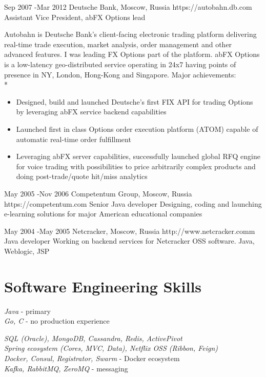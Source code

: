 \documentclass[10pt]{article} %
\begin{document}
\job
{Sep 2007 -}{Mar 2012}
{Deutsche Bank, Moscow, Russia}
{https://autobahn.db.com}
{Assistant Vice President, abFX Options lead}
{Autobahn is Deutsche Bank's client-facing electronic trading platform delivering real-time trade execution, market analysis, order management and other advanced features. 
I was leading FX Options part of the platform. abFX Options is a low-latency geo-distributed service operating in 24x7 having points of presence in NY, London, Hong-Kong and Singapore. 
Major achievements: \\*
\begin{itemize}
\item{Designed, build and launched Deutsche's first FIX API for trading Options by leveraging abFX service backend capabilities}
\item{Launched first in class Options order execution platform (ATOM) capable of automatic real-time order fulfillment}
\item{Leveraging abFX server capabilities, successfully launched global RFQ engine for voice trading with possibilities to price arbitrarily complex products and doing post-trade/quote hit/miss analytics}
\end{itemize}
}

\job
{May 2005 -}{Nov 2006}
{Competentum Group, Moscow, Russia}
{https://competentum.com}
{Senior Java developer}
{Designing, coding and launching e-learning solutions for major American educational companies}

\job
{May 2004 -}{May 2005}
{Netcracker, Moscow, Russia}
{http://www.netcracker.comm}
{Java developer}
{Working on backend services for Netcracker OSS software. Java, Weblogic, JSP}


\section{Software Engineering Skills}

{
\textit{Java} - primary \\
\textit{Go, C} - no production experience\\
}


{
\textit{SQL (Oracle), MongoDB, Cassandra, Redis, ActivePivot}\\
\textit{Spring ecosystem (Cores, MVC, Data), Netflix OSS (Ribbon, Feign)}\\
\textit{Docker, Consul, Registrator, Swarm} - Docker ecosystem\\
\textit{Kafka, RabbitMQ, ZeroMQ} - messaging\\
}
\end{document}
